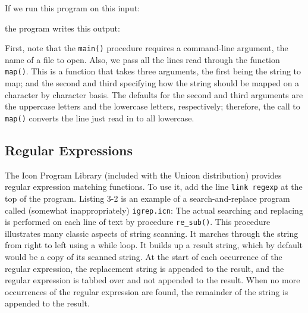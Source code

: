 \noindent If we run this program on this input: 


\noindent the program writes this output: 


First, note that the \texttt{main()} procedure requires a command-line
argument, the name of a file to open. Also, we pass all the lines read
through the function \texttt{map()}. This is a function that takes
three arguments, the first being the string to map; and the second and
third specifying how the string should be mapped on a character by
character basis. The defaults for the second and third arguments are
the uppercase letters and the lowercase letters, respectively;
therefore, the call to \texttt{map()} converts the line just read in to
all lowercase.

\subsection{Regular Expressions}

The Icon Program Library (included with the Unicon distribution)
provides regular expression matching
functions. To use it, add the line \texttt{link regexp} at the top of
the program. Listing 3-2 is an example of a search-and-replace program
called (somewhat inappropriately)
\texttt{i}\texttt{grep}\texttt{.icn}: The actual searching
and replacing is performed on each line of text by procedure
\texttt{re\_sub()}. This procedure illustrates many classic aspects of
string scanning. It marches through the string from right to left using
a while loop. It builds up a result string, which by default would be a
copy of its scanned string. At the start of each occurrence of the
regular expression, the replacement string is appended to the result,
and the regular expression is tabbed over and not appended to the
result. When no more occurrences of the regular expression are found,
the remainder of the string is appended to the result.

